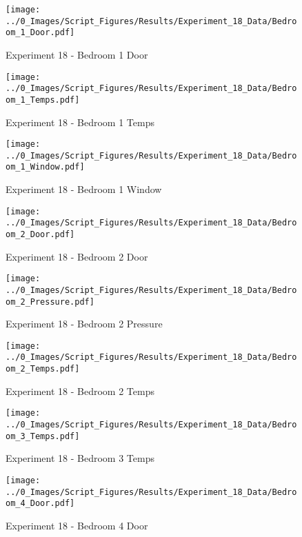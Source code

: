 	\begin{figure}[H]
		\centering
		\texttt{[image: ../0\_Images/Script\_Figures/Results/Experiment\_18\_Data/Bedroom\_1\_Door.pdf]}
		\caption[]{Experiment 18 - Bedroom 1 Door}
	\end{figure}
 

	\begin{figure}[H]
		\centering
		\texttt{[image: ../0\_Images/Script\_Figures/Results/Experiment\_18\_Data/Bedroom\_1\_Temps.pdf]}
		\caption[]{Experiment 18 - Bedroom 1 Temps}
	\end{figure}
 
	\clearpage

	\begin{figure}[H]
		\centering
		\texttt{[image: ../0\_Images/Script\_Figures/Results/Experiment\_18\_Data/Bedroom\_1\_Window.pdf]}
		\caption[]{Experiment 18 - Bedroom 1 Window}
	\end{figure}
 

	\begin{figure}[H]
		\centering
		\texttt{[image: ../0\_Images/Script\_Figures/Results/Experiment\_18\_Data/Bedroom\_2\_Door.pdf]}
		\caption[]{Experiment 18 - Bedroom 2 Door}
	\end{figure}
 
	\clearpage

	\begin{figure}[H]
		\centering
		\texttt{[image: ../0\_Images/Script\_Figures/Results/Experiment\_18\_Data/Bedroom\_2\_Pressure.pdf]}
		\caption[]{Experiment 18 - Bedroom 2 Pressure}
	\end{figure}
 

	\begin{figure}[H]
		\centering
		\texttt{[image: ../0\_Images/Script\_Figures/Results/Experiment\_18\_Data/Bedroom\_2\_Temps.pdf]}
		\caption[]{Experiment 18 - Bedroom 2 Temps}
	\end{figure}
 
	\clearpage

	\begin{figure}[H]
		\centering
		\texttt{[image: ../0\_Images/Script\_Figures/Results/Experiment\_18\_Data/Bedroom\_3\_Temps.pdf]}
		\caption[]{Experiment 18 - Bedroom 3 Temps}
	\end{figure}
 

	\begin{figure}[H]
		\centering
		\texttt{[image: ../0\_Images/Script\_Figures/Results/Experiment\_18\_Data/Bedroom\_4\_Door.pdf]}
		\caption[]{Experiment 18 - Bedroom 4 Door}
	\end{figure}
 
